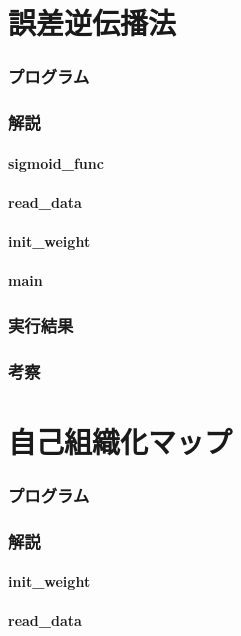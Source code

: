 \documentclass{jsarticle}
\begin{document}
\part{誤差逆伝播法}
\section{プログラム}


\section{解説}
\subsection{sigmoid\_func}
\subsection{read\_data}
\subsection{init\_weight}
\subsection{main}
\section{実行結果}
\section{考察}

\part{自己組織化マップ}
\section{プログラム}


\section{解説}
\subsection{init\_weight}
\subsection{read\_data}
\end{document}
